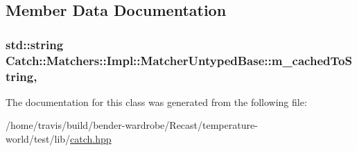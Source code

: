 \subsection{Member Data Documentation}
\hypertarget{class_catch_1_1_matchers_1_1_impl_1_1_matcher_untyped_base_a951095c462657e7097a9a6dc4dde813f}{
\subsubsection[{m\-\_\-cached\-To\-String}]{\setlength{\rightskip}{0pt plus 5cm}std\-::string Catch\-::\-Matchers\-::\-Impl\-::\-Matcher\-Untyped\-Base\-::m\-\_\-cached\-To\-String\hspace{0.3cm}{\ttfamily [mutable]}, {\ttfamily [protected]}}}\label{class_catch_1_1_matchers_1_1_impl_1_1_matcher_untyped_base_a951095c462657e7097a9a6dc4dde813f}


The documentation for this class was generated from the following file\-:\begin{DoxyCompactItemize}
\item 
/home/travis/build/bender-\/wardrobe/\-Recast/temperature-\/world/test/lib/\hyperlink{catch_8hpp}{catch.\-hpp}\end{DoxyCompactItemize}
